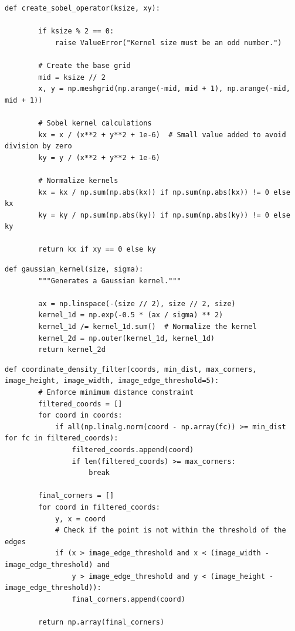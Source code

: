 \documentclass[11pt, conference, letterpaper]{IEEEtran}
\begin{document}
\begin{lstlisting}[style=python, caption={Sobel Kernel}, label={lst:sobel-kernel}]
    def create_sobel_operator(ksize, xy):

        if ksize % 2 == 0:
            raise ValueError("Kernel size must be an odd number.")
        
        # Create the base grid
        mid = ksize // 2
        x, y = np.meshgrid(np.arange(-mid, mid + 1), np.arange(-mid, mid + 1))
        
        # Sobel kernel calculations
        kx = x / (x**2 + y**2 + 1e-6)  # Small value added to avoid division by zero
        ky = y / (x**2 + y**2 + 1e-6)
        
        # Normalize kernels
        kx = kx / np.sum(np.abs(kx)) if np.sum(np.abs(kx)) != 0 else kx
        ky = ky / np.sum(np.abs(ky)) if np.sum(np.abs(ky)) != 0 else ky
        
        return kx if xy == 0 else ky
\end{lstlisting}

\newpage
\begin{lstlisting}[style=python, caption={Gaussian Kernel}, label={lst:gaussian-kernel}]
    def gaussian_kernel(size, sigma):
        """Generates a Gaussian kernel."""
                
        ax = np.linspace(-(size // 2), size // 2, size)
        kernel_1d = np.exp(-0.5 * (ax / sigma) ** 2)
        kernel_1d /= kernel_1d.sum()  # Normalize the kernel
        kernel_2d = np.outer(kernel_1d, kernel_1d)
        return kernel_2d
\end{lstlisting}

\begin{lstlisting}[style=python, caption={Corner Density Filter}, label={lst:corner_filter}]
    def coordinate_density_filter(coords, min_dist, max_corners, image_height, image_width, image_edge_threshold=5):
        # Enforce minimum distance constraint
        filtered_coords = []
        for coord in coords:
            if all(np.linalg.norm(coord - np.array(fc)) >= min_dist for fc in filtered_coords):
                filtered_coords.append(coord)
                if len(filtered_coords) >= max_corners:
                    break

        final_corners = []    
        for coord in filtered_coords:
            y, x = coord
            # Check if the point is not within the threshold of the edges
            if (x > image_edge_threshold and x < (image_width - image_edge_threshold) and
                y > image_edge_threshold and y < (image_height - image_edge_threshold)):
                final_corners.append(coord)

        return np.array(final_corners)
\end{lstlisting}
\twocolumn
\end{document}
